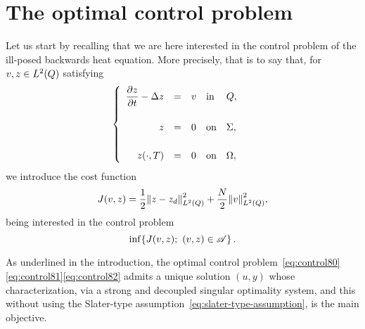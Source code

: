 \section{The optimal control problem}\label{sec:controlproblem}

Let us start by recalling that we are here interested in the control
problem of the ill-posed backwards heat equation. More precisely, that is
to say that, for $v,z\in L^{2}\!\left({Q}\right)$ satisfying
\begin{equation}\label{eq:control80}
    \begin{cases}\displaystyle
        \begin{array}{rclll}
            \dfrac{\partial{}z}{\partial{}t} - \Delta z & = & v & \text{in} & Q,\\
            \\
            z & = & 0 & \text{on} & \Sigma,\\
            \\
            {z}\!\left({\cdot,T}\right) & = & 0 & \text{on} & \Omega,
        \end{array}
    \end{cases}
\end{equation}
we introduce the cost function
\begin{equation}\label{eq:control81}
    J(v,z) = \dfrac{1}{2}{\left\|{z - z_{d} }\right\|}_{L^{2}\left({Q}\right)}^{2} + \dfrac{N}{2}{\left\|{v }\right\|}_{L^{2}\left({Q}\right)}^{2},
\end{equation}
being interested in the control problem
\begin{equation}\label{eq:control82}
    \inf\!\left\{{%
        J(v,z);\ (v,z)\in\Ascr
    }\right\}.
\end{equation}

As underlined in the introduction, the optimal control
problem~\eqref{eq:control80}\eqref{eq:control81}\eqref{eq:control82} admits
a unique solution $(u,y)$ whose characterization, via a strong and
decoupled singular optimality system, and this without using the
Slater-type assumption~\eqref{eq:slater-type-assumption}, is the main
objective.

